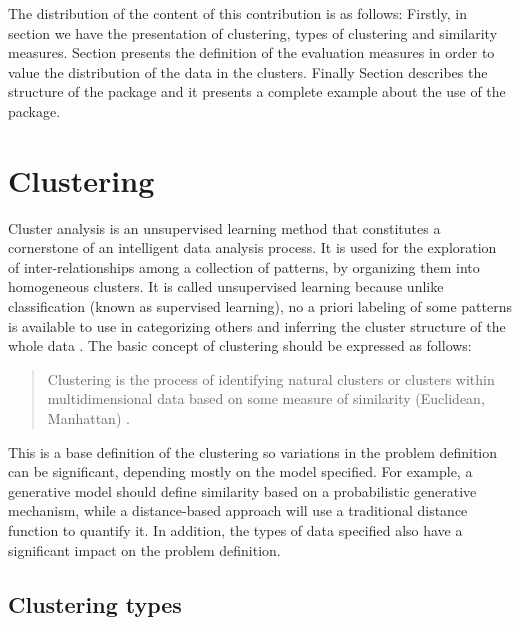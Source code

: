 The distribution of the content of this contribution is as follows: Firstly, in section  we have the  presentation of clustering, types of clustering and similarity measures. Section  presents the definition of the evaluation measures in order to value the distribution of the data in the clusters. Finally Section  describes the structure of the package and it presents a complete example about the use of the package.

\section{Clustering} \label{sec:seccion1}

Cluster analysis is an unsupervised learning method that constitutes a cornerstone of an intelligent data analysis process. It is used for the exploration of inter-relationships among a collection of patterns, by organizing them into homogeneous clusters. It is called unsupervised learning because unlike classification (known as supervised learning), no a priori labeling of some patterns is available to use in categorizing others and inferring the cluster structure of the whole data \citep{b17}. The basic concept of clustering should be expressed as follows:
\\
\begin{quote}
Clustering is the process of identifying natural clusters or clusters within multidimensional data based on some measure of similarity (Euclidean, Manhattan) \citep{b18}.
\end{quote}


This is a base definition of the clustering so variations in the problem definition can be significant, depending mostly on the model specified. For example, a generative model should define similarity based on a probabilistic generative mechanism, while a distance-based approach will use a traditional distance function to quantify it. In addition, the types of data specified also have a significant impact on the problem definition.

\subsection{Clustering types}

